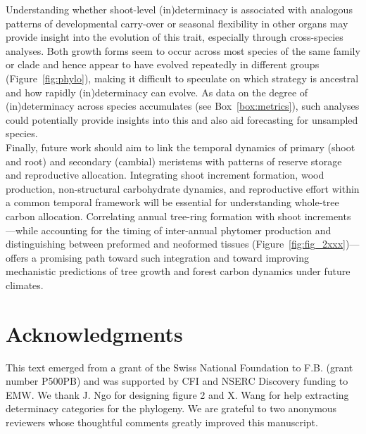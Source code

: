 \documentclass{article}
\begin{document}
Understanding whether shoot-level (in)determinacy is associated with analogous patterns of developmental carry-over or seasonal flexibility in other organs may provide insight into the evolution of this trait, especially through cross-species analyses. Both growth forms seem to occur across most species of the same family or clade and hence appear to have evolved repeatedly in different groups (Figure~\ref{fig:phylo}), making it difficult to speculate on which strategy is ancestral \citep[but see][]{hariharanIndeterminateGrowthCould2016} and how rapidly (in)determinacy can evolve. As data on the degree of (in)determinacy across species accumulates (see Box~\ref{box:metrics}), such analyses could potentially provide  insights into this and also aid forecasting for unsampled species.\\ %

Finally, future work should aim to link the temporal dynamics of primary (shoot and root) and secondary (cambial) meristems with patterns of reserve storage and reproductive allocation. Integrating shoot increment formation, wood production, non-structural carbohydrate dynamics, and reproductive effort within a common temporal framework will be essential for understanding whole-tree carbon allocation. Correlating annual tree-ring formation with shoot increments—while accounting for the timing of inter-annual phytomer production and distinguishing between preformed and neoformed tissues (Figure~\ref{fig:fig_2xxx})—offers a promising path toward such integration and toward improving mechanistic predictions of tree growth and forest carbon dynamics under future climates.


	
\section*{Acknowledgments}
	This text emerged from a grant of the Swiss National Foundation to F.B. (grant number P500PB) and was supported by CFI and NSERC Discovery funding to EMW. We thank J. Ngo for designing figure 2 and X. Wang for help extracting determinacy categories for the phylogeny. We are grateful to two anonymous reviewers whose thoughtful comments greatly improved this manuscript. 
	
\end{document}
